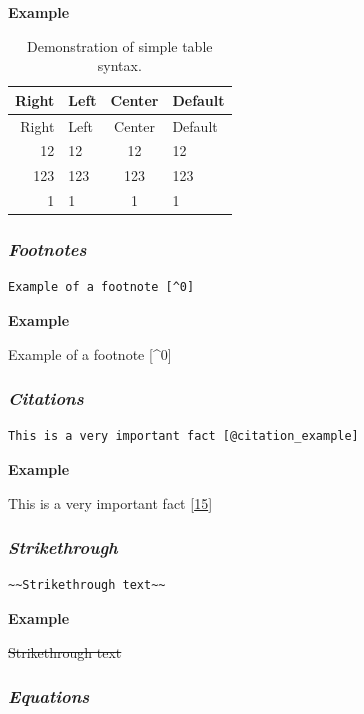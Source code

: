 \documentclass[journal,]{IEEEtran}
\begin{document}
\textbf{Example}

\begin{longtable}[]{@{}rlcl@{}}
\caption{Demonstration of simple table syntax.
\label{tbl:table}}\tabularnewline
\toprule
Right & Left & Center & Default\tabularnewline
\midrule
\endfirsthead
\toprule
Right & Left & Center & Default\tabularnewline
\midrule
\endhead
12 & 12 & 12 & 12\tabularnewline
123 & 123 & 123 & 123\tabularnewline
1 & 1 & 1 & 1\tabularnewline
\bottomrule
\end{longtable}

\hypertarget{footnotes}{%
\subsubsection{\texorpdfstring{\textbf{\emph{Footnotes}}}{Footnotes}}\label{footnotes}}

\begin{verbatim}
Example of a footnote [^0]
\end{verbatim}

\textbf{Example}

Example of a footnote {[}\^{}0{]}

\hypertarget{citations}{%
\subsubsection{\texorpdfstring{\textbf{\emph{Citations}}}{Citations}}\label{citations}}

\begin{verbatim}
This is a very important fact [@citation_example]
\end{verbatim}

\textbf{Example}

This is a very important fact
{[}\protect\hyperlink{ref-citation_example}{15}{]}

\hypertarget{strikethrough}{%
\subsubsection{\texorpdfstring{\textbf{\emph{Strikethrough}}}{Strikethrough}}\label{strikethrough}}

\begin{verbatim}
~~Strikethrough text~~
\end{verbatim}

\textbf{Example}

\sout{Strikethrough text}

\hypertarget{equations}{%
\subsubsection{\texorpdfstring{\textbf{\emph{Equations}}}{Equations}}\label{equations}}
\end{document}
